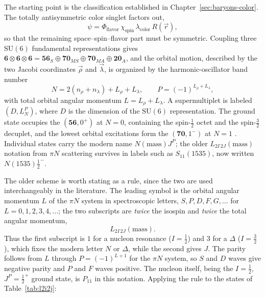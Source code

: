 The starting point is the classification established in
Chapter~\ref{sec:baryons-color}. The totally antisymmetric color singlet factors out,
\begin{equation}
    \psi = \Phi_{\text{flavor}}\,\chi_{\text{spin}}\,\lambda_{\text{color}}\,R(\vec{r}),
\end{equation}
so that the remaining space--spin--flavor part must be symmetric. Coupling three
$\mathrm{SU}(6)$ fundamental representations gives
$\mathbf{6}\otimes\mathbf{6}\otimes\mathbf{6}
= \mathbf{56}_S\oplus\mathbf{70}_{MS}\oplus\mathbf{70}_{MA}\oplus\mathbf{20}_A$, and the orbital
motion, described by the two Jacobi coordinates $\vec\rho$ and $\vec\lambda$, is organized
by the harmonic-oscillator band number
\begin{equation}
    N = 2(n_\rho + n_\lambda) + L_{\rho} + L_{\lambda},
    \qquad
    P = (-1)^{L_{\rho} + L_{\lambda}},
\end{equation}
with total orbital angular momentum $L = L_{\rho} + L_{\lambda}$. A supermultiplet is
labeled $(D, L^{P}_{N})$, where $D$ is the dimension of the $\mathrm{SU}(6)$ representation.
The ground state occupies the $(\mathbf{56},0^{+})$ at $N=0$, containing the
spin-$\tfrac{1}{2}$ octet and the spin-$\tfrac{3}{2}$ decuplet, and the lowest orbital
excitations form the $(\mathbf{70},1^{-})$ at $N=1$ \cite[Ch.~15]{Amsler2018}. Individual
states carry the modern name $N(\text{mass})J^{P}$; the older $L_{2I\,2J}(\text{mass})$
notation from $\pi N$ scattering survives in labels such as $S_{11}(1535)$, now written
$N(1535)\tfrac{1}{2}^-$.

The older scheme is worth stating as a rule, since the two are used interchangeably in the
literature. The leading symbol is the orbital angular momentum $L$ of the $\pi N$ system in
spectroscopic letters, $S, P, D, F, G,\dots$ for $L = 0,1,2,3,4,\dots$; the two subscripts
are \emph{twice} the isospin and \emph{twice} the total angular momentum,
\begin{equation}
    L_{2I\,2J}(\text{mass}).
    \label{eq:l2i2j}
\end{equation}
Thus the first subscript is $1$ for a nucleon resonance ($I=\tfrac12$) and $3$ for a
$\Delta$ ($I=\tfrac32$), which fixes the modern letter $N$ or $\Delta$, while the second
gives $J$. The parity follows from $L$ through $P = (-1)^{L+1}$ for the $\pi N$ system, so
$S$ and $D$ waves give negative parity and $P$ and $F$ waves positive. The nucleon itself,
being the $I=\tfrac12$, $J^{P}=\tfrac12^{+}$ ground state, is $P_{11}$ in this notation.
Applying the rule to the states of Table~\ref{tab:l2i2j}:

